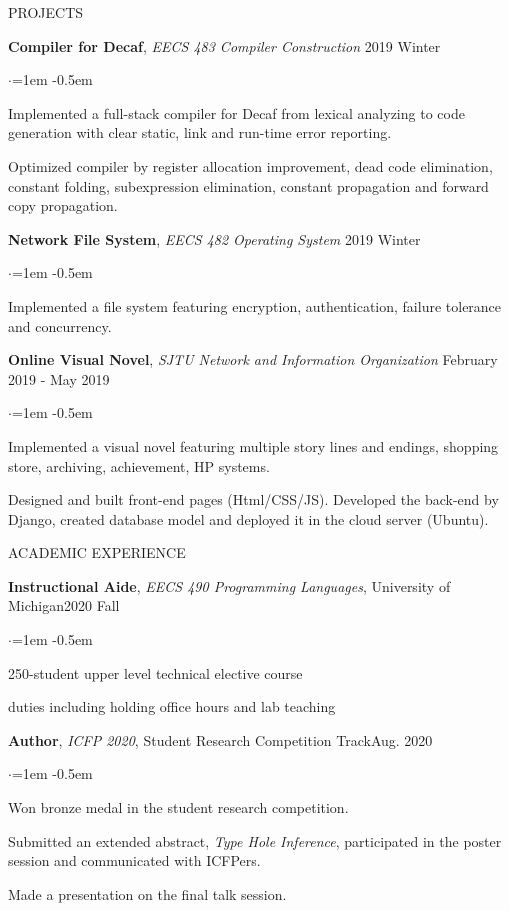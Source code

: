 \documentclass{resume} %
\newcommand{\rrsection}[5]{%
 {\textbf{#1}, }{\textit{#2},} {#3}\hfill{#4} \noindent
  \begin{list}{$\cdot$}{\leftmargin=1em}
   \itemsep -0.5em \vspace{-0.5em} 
  #5
  \end{list}
  \vspace{-0.5em} 
}
\newcommand{\project}[4]{%
 {\textbf{#1}, }{\textit{#2}} \hfill{#3} \noindent
  \begin{list}{$\cdot$}{\leftmargin=1em}
   \itemsep -0.5em \vspace{-0.5em} 
  #4
  \end{list}
  \vspace{-0.5em} 
}
\begin{document}
\begin{rSection}{PROJECTS}

\project{Compiler for Decaf}{EECS 483
  Compiler Construction}{2019 Winter}{
  \item Implemented a full-stack compiler for Decaf from lexical analyzing to code generation with clear static, link and run-time error reporting.
  \item Optimized compiler by register allocation improvement, dead code elimination, constant folding, subexpression elimination, constant propagation and forward copy propagation.
}

\project{Network File System}{EECS 482
  Operating System}{2019 Winter}{
  \item Implemented a file system featuring encryption, authentication, failure tolerance and concurrency.
}

\project{Online Visual Novel}{SJTU Network and Information Organization}{February 2019 - May 2019}{
	\item Implemented a visual novel featuring multiple story lines and endings, shopping store, archiving, achievement, HP systems.
  \item Designed and built front-end pages (Html/CSS/JS). Developed the back-end by Django, created database model and deployed it in the cloud server (Ubuntu).
}



\end{rSection}

\begin{rSection}{ACADEMIC EXPERIENCE}

\rrsection{Instructional Aide}{EECS 490 Programming Languages}{University
  of Michigan}{2020 Fall}{
  \item 250-student upper level technical elective course
  \item duties including holding office hours and lab teaching
}

\rrsection{Author}{ICFP 2020}{Student Research Competition Track}{Aug. 2020}{
  \item Won bronze medal in the student research competition.
  \item Submitted an extended abstract, \textit{Type Hole Inference}, participated in the poster session and communicated with ICFPers.
  \item Made a presentation on the final talk session.
}

\end{rSection}
\end{document}

